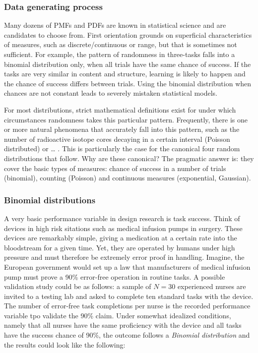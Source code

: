 \documentclass[]{svmono}
\theoremstyle{definition}
\theoremstyle{definition}
\theoremstyle{definition}
\theoremstyle{remark}
\begin{document}
\subsubsection{Data generating process}\label{data-generating-process}

Many dozens of PMFs and PDFs are known in statistical science and are
candidates to choose from. First orientation grounds on superficial
characteristics of measures, such as discrete/continuous or range, but
that is sometimes not sufficient. For example, the pattern of randomness
in three-tasks falls into a binomial distribution only, when all trials
have the same chance of success. If the tasks are very similar in
content and structure, learning is likely to happen and the chance of
success differs between trials. Using the binomial distribution when
chances are not constant leads to severely mistaken statistical models.

For most distributions, strict mathematical definitions exist for under
which circumstances randomness takes this particular pattern.
Frequently, there is one or more natural phenomena that accurately fall
into this pattern, such as the number of radioactive isotope cores
decaying in a certain interval (Poisson distributed) or \ldots{} . This
is particularly the case for the canonical four random distributions
that follow. Why are these canonical? The pragmatic answer is: they
cover the basic types of measures: chance of success in a number of
trials (binomial), counting (Poisson) and continuous measures
(exponential, Gaussian).

\subsubsection{Binomial distributions}\label{binomial_dist}

A very basic performance variable in design research is task success.
Think of devices in high risk sitations such as medical infusion pumps
in surgery. These devices are remarkably simple, giving a medication at
a certain rate into the bloodstream for a given time. Yet, they are
operated by humans under high pressure and must therefore be extremely
error proof in handling. Imagine, the European government would set up a
law that manufacturers of medical infusion pump must prove a 90\%
error-free operation in routine tasks. A possible validation study could
be as follows: a sample of \(N = 30\) experienced nurses are invited to
a testing lab and asked to complete ten standard tasks with the device.
The number of error-free task completions per nurse is the recorded
performance variable tpo validate the 90\% claim. Under somewhat
idealized conditions, namely that all nurses have the same proficiency
with the device and all tasks have the success chance of 90\%, the
outcome follows a \emph{Binomial distribution} and the results could
look like the following:
\end{document}
